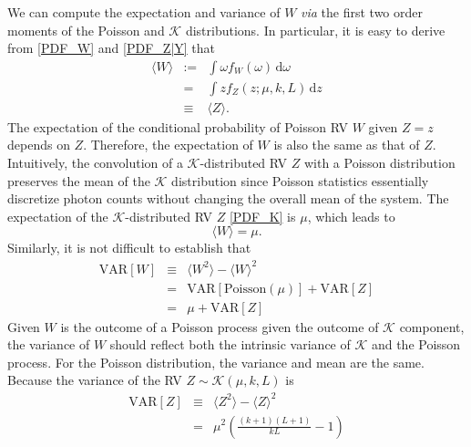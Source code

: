 \documentclass[11pt]{article}
\theoremstyle{definition}
\begin{document}
We can compute the expectation and variance of $W$ \textit{via} the first two order moments of the Poisson  and $\mathcal{K}$ distributions. In particular, it is easy to derive from \eqref{PDF_W} and \eqref{PDF_Z|Y} that   
%
\begin{equation}
\begin{array}{rcl}
\langle W \rangle
&:=&\displaystyle \int \omega f_{W}(\omega) \, \text{d}\omega\\[1em]
&=&\displaystyle \int z f_{Z}(z;\mu,k,L) \, \text{d}z\\[1.2em] 
&\equiv& \langle Z \rangle. 
\end{array}
\label{mu_W_}
\end{equation}
The expectation of the conditional probability of Poisson RV \(W\) given \(Z = z\) depends on \(Z\). Therefore, the expectation of \(W\) is also the same as that of \(Z\). Intuitively, the convolution of a \(\mathcal{K}\)-distributed RV \(Z\) with a Poisson distribution preserves the mean of the \(\mathcal{K}\) distribution since Poisson statistics essentially discretize photon counts without changing the overall mean of the system.
%
The expectation of the $\mathcal{K}$-distributed
RV $Z$ \eqref{PDF_K} is $\mu$, which leads to 
%
\begin{equation}
\langle W \rangle  = \mu.
\label{mu_W}
\end{equation}
%
Similarly, it is not difficult to establish that 
%
\begin{equation}
\begin{array}{rcl}
\text{VAR}[W] &\equiv& \langle W^2 \rangle - \langle W \rangle^2\\[1em]
&=& \text{VAR}[\text{Poisson}(\mu)] + \text{VAR}[Z]\\[1em]
&=& \mu + \text{VAR}[Z]
\end{array}
\label{VAR_W_}
\end{equation}
Given \(W\) is the outcome of a Poisson process given the outcome of \(\mathcal{K}\) component, the variance of \(W\) should reflect both the intrinsic variance of \(\mathcal{K}\) and the Poisson process. For the Poisson distribution, the variance and mean are the same.
%
Because the variance of the RV $Z  \sim \mathcal{K}(\mu, k, L)$ is 
%
\begin{equation}
\begin{array}{rcl}
\text{VAR}[Z] &\equiv& \langle Z^2 \rangle - \langle Z \rangle^2\\[1em]
&=& \mu^2 \left( \frac{(k+1)(L+1)}{kL} - 1\right) 
\end{array}
\label{VAR_Z}
\end{equation}
\end{document}
